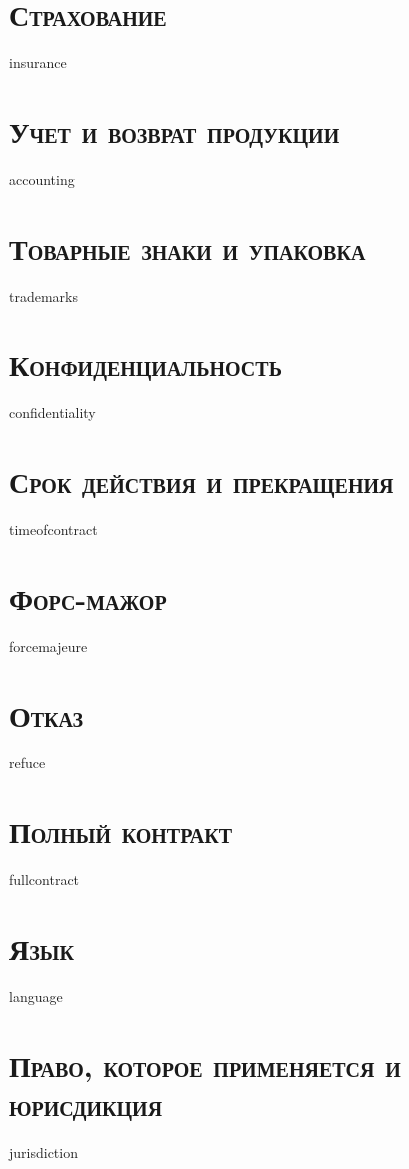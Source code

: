 {{{{{{\section{\large \textbf{\textsc{Страхование}}}
{{insurance}}

\section{\large \textbf{\textsc{Учет и возврат продукции}}}
{{accounting}}

\section{\large \textbf{\textsc{Товарные знаки и упаковка}}}
{{trademarks}}

\section{\large \textbf{\textsc{Конфиденциальность}}}
{{confidentiality}}

\section{\large \textbf{\textsc{Срок действия и прекращения}}}
{{timeofcontract}}

\section{\large \textbf{\textsc{Форс-мажор}}}
{{forcemajeure}}

\section{\large \textbf{\textsc{Отказ}}}
{{refuce}}

\section{\large \textbf{\textsc{Полный контракт}}}
{{fullcontract}}

\section{\large \textbf{\textsc{Язык}}}
{{language}}

\section{\large \textbf{\textsc{Право, которое применяется и юрисдикция}}}
{{jurisdiction}}

}}}}}}
